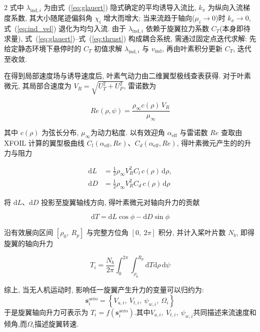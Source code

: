 \documentclass{aas}
\begin{document}
\begin{multicols}{2}
式中 $\lambda_{\mathrm{ind},i}$ 为由式~(\ref{eq:glauert}) 隐式确定的平均诱导入流比,
$k_x$ 为纵向入流梯度系数, 其大小随尾迹偏斜角 $\chi_i$ 增大而增大;
当来流趋于轴向($\mu_i\to0$)时 $k_x\to0$, 式~(\ref{eq:ind_vel}) 退化为均匀入流.
由于 $\lambda_{\mathrm{ind},i}$ 依赖于旋翼拉力系数 $C_T$(本身即待求量),
式~(\ref{eq:glauert})--式~(\ref{eq:thrust}) 构成耦合系统, 需通过固定点迭代求解:
先给定静态环境下悬停时的 $C_T$ 初值求解 $\lambda_{\mathrm{ind},i}$ 与 $v_{\mathrm{ind}}$,
再由叶素积分更新 $C_T$, 迭代至收敛.

\label{subsec:lift}

在得到局部速度场与诱导速度后, 叶素气动力由二维翼型极线查表获得. 对于叶素微元, 其局部合速度为 $V_R=\sqrt{U_T^2+U_P^2}$,
雷诺数为

\begin{equation}
Re(\rho,\psi)=\frac{\rho_\infty c(\rho)\,V_R}{\mu_\infty}
\label{eq:Re}
\end{equation}

其中 $c(\rho)$ 为弦长分布, $\mu_\infty$为动力粘度.
以有效迎角 $\alpha_{\mathrm{eff}}$ 与雷诺数 $Re$ 查取由 XFOIL\cite{12} 计算的翼型极曲线
$C_l(\alpha_{\mathrm{eff}},Re)$、$C_d(\alpha_{\mathrm{eff}},Re)$, 得叶素微元产生的的升力与阻力

\begin{equation}
\begin{aligned}
\mathrm{d}L&=\frac{1}{2}\rho_\infty V_R^2 C_l\,c(\rho)\,\mathrm{d}\rho,\\
\mathrm{d}D&=\frac{1}{2}\rho_\infty V_R^2 C_d\,c(\rho)\,\mathrm{d}\rho
\end{aligned}
\label{eq:dLdD}
\end{equation}

将 $\mathrm{d}L$、$\mathrm{d}D$ 投影至旋翼轴线方向, 得叶素微元对轴向升力的贡献

\begin{equation}
\mathrm{d}T=\mathrm{d}L\cos\phi-\mathrm{d}D\sin\phi
\label{eq:dT}
\end{equation}

沿有效展向区间 $[\rho_0,\ R_p]$ 与完整方位角 $[0,\ 2\pi]$ 积分, 并计入桨叶片数
$N_b$, 即得旋翼的轴向升力

\begin{equation}
T_i=\frac{N_b}{2\pi}\int_{0}^{2\pi}\!\!\int_{\rho_0}^{R_p}
\mathrm{d}T\mathrm{d}\rho\,\mathrm{d}\psi
\label{eq:thrust}
\end{equation}

综上, 当无人机运动时, 影响任一旋翼产生升力的变量可以归约为:
\begin{equation}
\bm{s}_i^{\mathrm{aero}}=\left\{V_{a,i},\ V_{t,i},\ \psi_{w,i}, \ \Omega_i\right\}
\label{eq:state_aero}
\end{equation}
于是旋翼轴向升力可表示为 $T_i=f\!\left(\bm{s}_i^{\mathrm{aero}}\right)$.其中$V_{a,i},\ V_{t,i},\ \psi_{w,i}$共同描述来流速度和倾角,而$\Omega_i$描述旋翼转速.


\end{multicols}
\end{document}
